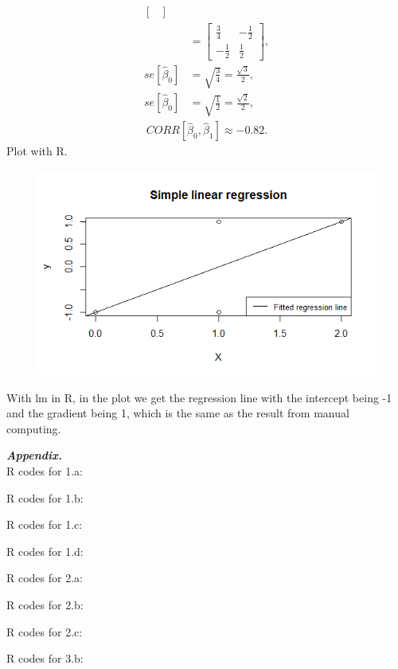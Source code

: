 \documentclass[10pt]{article}
\begin{document}
\begin{enumerate}[1)]
\begin{align*}
\begin{bmatrix}
  \end{bmatrix}
\\
&=
  \begin{bmatrix}
    \frac{3}{4} & -\frac{1}{2}\\
    -\frac{1}{2} & \frac{1}{2}
  \end{bmatrix}
,\\
se[\hat{\beta}_0]&=\sqrt{\frac{3}{4}}=\frac{\sqrt{3}}{2},\\
se[\hat{\beta}_0]&=\sqrt{\frac{1}{2}}=\frac{\sqrt{2}}{2},
\end{align*}
\begin{align*}
CORR[\hat{\beta}_0,\hat{\beta}_1]\approx-0.82.
\end{align*}
Plot with R.
\begin{figure}[H]
  \centering
  \includegraphics[scale=0.6]{p32b.png}
\end{figure}
With {\ttfamily lm} in R, in the plot we get the regression line with the intercept being -1 and the gradient being 1, which is the same as the result from manual computing.\\

\end{enumerate}

\newpage

\textbf{\textit{Appendix.}}\\

R codes for 1.a:

\vspace{3mm}

R codes for 1.b:

\vspace{3mm}

R codes for 1.c:

\vspace{3mm}

R codes for 1.d:

\vspace{3mm}

R codes for 2.a:

\vspace{3mm}

R codes for 2.b:

\vspace{3mm}

R codes for 2.c:

\vspace{3mm}

R codes for 3.b:

\vspace{3mm}
\end{document}
